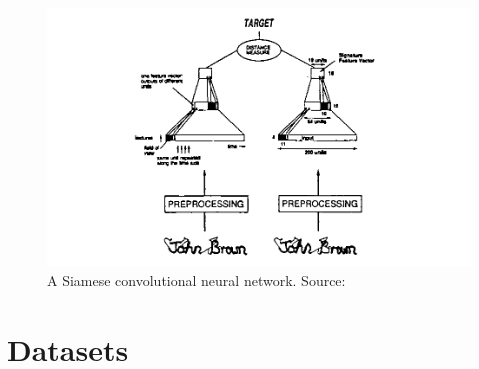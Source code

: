 \begin{frame}
\begin{figure}
\begin{center}
\includegraphics[width=1.47\textheight, height=0.9\textheight]{figs/diagram/bromley94}
\end{center}
\vspace{-0.3cm}%
\caption{A Siamese convolutional neural network. Source: \textcite{bromley94}}
\end{figure}
\end{frame}

\section{Datasets}

